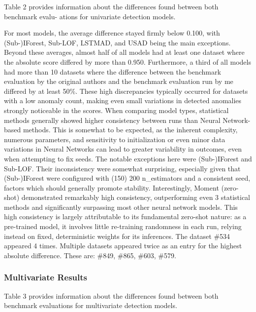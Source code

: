 \documentclass[12pt,oneside]{article}
\begin{document}
Table 2 provides information about the differences found between both benchmark evalu-
ations for univariate detection models. \par
For most models, the average difference stayed firmly below 0.100, with (Sub-)IForest, Sub-LOF, LSTMAD, and USAD being the main exceptions. Beyond these averages, almost half of all models had at least one dataset where the absolute score differed by more than 0.950. Furthermore, a third of all models had more than 10 datasets where the difference between the benchmark evaluation by the original authors and the benchmark evaluation run by me differed by at least 50\%. These high discrepancies typically occurred for datasets with a low anomaly count, making even small variations in detected anomalies strongly noticeable in the scores. When comparing model types, statistical methods generally showed higher consistency between runs than Neural Network-based methods. This is somewhat to be expected, as the inherent complexity, numerous parameters, and sensitivity to initialization or even minor data variations in Neural Networks can lead to greater variability in outcomes, even when attempting to fix seeds. The notable exceptions here were (Sub-)IForest and Sub-LOF. Their inconsistency were somewhat surprising, especially given that (Sub-)IForest were configured with (150) 200 n\_estimators and a consistent seed, factors which should generally promote stability. Interestingly, Moment (zero-shot) demonstrated remarkably high consistency, outperforming even 3 statistical methods and significantly surpassing most other neural network models. This high consistency is largely attributable to its fundamental zero-shot nature: as a pre-trained model, it involves little re-training randomness in each run, relying instead on fixed, deterministic weights for its inferences. The dataset \#534 appeared 4 times. Multiple datasets appeared twice as an entry for the highest absolute difference. These are: \#849, \#865, \#603, \#579.

\subsubsection{Multivariate Results}

Table 3 provides information about the differences found between both benchmark evaluations for multivariate detection models.
\end{document}
